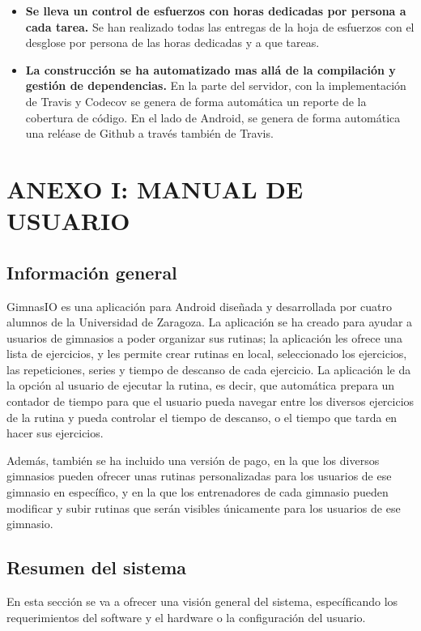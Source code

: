 \documentclass[11pt,a4paper]{report}
\begin{document}
\begin{itemize}
	\item \textbf{Se lleva un control de esfuerzos con horas dedicadas por persona a cada tarea.} Se han realizado todas las entregas de la hoja de esfuerzos con el desglose por persona de las horas dedicadas y a que tareas.

	\item \textbf{La construcción se ha automatizado mas allá de la compilación y gestión de dependencias.} En la parte del servidor, con la implementación de Travis y Codecov se genera de forma automática un reporte de la cobertura de código. En el lado de Android, se genera de forma automática una reléase de Github a través también de Travis.

\end{itemize}
\chapter{ANEXO I: MANUAL DE USUARIO}
\section{Información general}
GimnasIO es una aplicación para Android diseñada y desarrollada por cuatro alumnos de la Universidad de Zaragoza. La aplicación se ha creado para ayudar a usuarios de gimnasios a poder organizar sus rutinas; la aplicación les ofrece una lista de ejercicios, y les permite crear rutinas en local, seleccionado los ejercicios, las repeticiones, series y tiempo de descanso de cada ejercicio. La aplicación le da la opción al usuario de ejecutar la rutina, es decir, que automática prepara un contador de tiempo para que el usuario pueda navegar entre los diversos ejercicios de la rutina y pueda controlar el tiempo de descanso, o el tiempo que tarda en hacer sus ejercicios.

Además, también se ha incluido una versión de pago, en la que los diversos gimnasios pueden ofrecer unas rutinas personalizadas para los usuarios de ese gimnasio en específico, y en la que los entrenadores de cada gimnasio pueden modificar y subir rutinas que serán visibles únicamente para los usuarios de ese gimnasio.

\section{Resumen del sistema}
En esta sección se va a ofrecer una visión general del sistema, específicando los requerimientos del   software y el hardware o la configuración del usuario.
\end{document}
